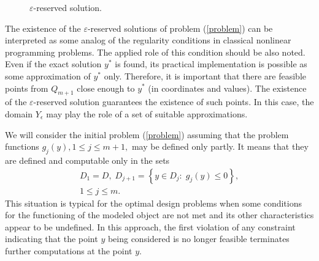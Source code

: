 \documentclass[twocolumn]{svjour3}          %
\begin{document}
\begin{figure}
	\caption{$\varepsilon$-reserved solution.}
	\label{fig:eps_reserved_solution}
\end{figure}

	The existence of the $\varepsilon$-reserved solutions of problem (\ref{problem}) can be interpreted as some analog of the regularity conditions in classical nonlinear programming problems. The applied role of this condition should be also noted. Even if the exact solution $y^\ast$ is found, its practical implementation is possible as some approximation of $y^\ast$ only. Therefore, it is important that there are feasible points from $Q_{m+1}$ close enough to $y^\ast$ (in coordinates and values). The existence of the $\varepsilon$-reserved solution guarantees the existence of such points. In this case, the domain $Y_{\epsilon}$ may play the role of a set of suitable approximations.

	We will consider the initial problem (\ref{problem}) assuming that the problem functions $g_{j}(y), 1 \leq j \leq m+1,$ may be defined only partly. It means that they are defined and computable only in the sets 
\begin{align}\label{D_sets}
	D_1 = D, \; D_{j+1} = \left\{ y \in D_j: \; g_j(y) \leq 0 \right\}, \nonumber \\
	1 \leq j \leq m.
\end{align}
This situation is typical for the optimal design problems when some conditions for the functioning of the modeled object are not met and its other characteristics appear to be undefined. In this approach, the first violation of any constraint indicating that the point $y$ being considered is no longer feasible terminates further computations at the point $y$.
\end{document}

